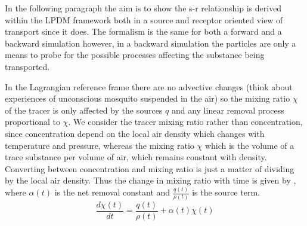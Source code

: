 \par In the following paragraph the aim is to show the s-r relationship is derived within the LPDM framework both in a source and receptor oriented view of transport since it does. The formalism is the same for both a forward and a backward simulation however, in a backward simulation the particles are only a means to probe for the possible processes affecting the substance being transported. \par In the Lagrangian reference frame there are no advective changes (think about experiences of unconscious mosquito suspended in the air) so the mixing ratio $\chi$ of the tracer is only affected by the sources $q$ and any linear removal process proportional to $\chi$. We consider the tracer mixing ratio rather than concentration, since concentration depend on the local air density which changes with temperature and pressure, whereas the mixing ratio $\chi$ which is the volume of a trace substance per volume of air, which remains constant with density. Converting between concentration and mixing ratio is just a matter of dividing by the local air density. Thus the change in mixing ratio with time is given by , where $\alpha(t)$ is the net removal constant and $\frac{q(t)}{\rho(t)}$ is the source term. 
\begin{equation}\label{eq:mix_ratio_lagr}
    \frac{d \chi(t)}{dt} = \frac{q(t)}{\rho(t)} + \alpha(t)\chi(t)
\end{equation}

